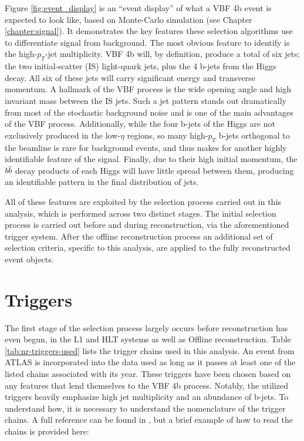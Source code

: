     Figure \ref{fig:event_display} is an ``event display'' of what a VBF \to 4b event is expected to look like,
        based on Monte-Carlo simulation (see Chapter \ref{chapter:signal}).
    It demonstrates the key features these selection algorithms use to differentiate signal from background.
    The most obvious feature to identify is the high-$p_T$-jet multiplicity.
    VBF \to 4b will, by definition, produce a total of six jets;
        the two initial-scatter (IS) light-quark jets, plus the 4 b-jets from the Higgs decay.
    All six of these jets will carry significant energy and transverse momentum.
    A hallmark of the VBF process is the wide opening angle and high invariant mass between the IS jets.
    Such a jet pattern stands out dramatically from most of the stochastic background noise
        and is one of the main advantages of the VBF process.
    Additionally, while the four b-jets of the Higgs are not exclusively produced in the low-$\eta$ regions,
        so many high-$p_T$ b-jets orthogonal to the beamline is rare for background events,
        and thus makes for another highly identifiable feature of the signal.
    Finally, due to their high initial momentum,
        the $b \bar{b}$ decay products of each Higgs will have little spread between them,
        producing an identifiable pattern in the final distribution of jets.

    All of these features are exploited by the selection process carried out in this analysis,
        which is performed across two distinct stages.
    The initial selection process is carried out before and during reconstruction, via the aforementioned trigger system.
    After the offline reconstruction process an additional set of selection criteria,
        specific to this analysis, are applied to the fully reconstructed event objects.
    
    \FloatBarrier
    \section{Triggers}
        
        The first stage of the selection process largely occurs before reconstruction has even begun,
            in the L1 and HLT systems as well as Offline reconstruction.
        Table \ref{tab:nr-triggers-used} lists the trigger chains used in this analysis.
        An event from ATLAS is incorporated into the data used as long as it passes at least one 
            of the listed chains associated with its year.
        These triggers have been chosen based on any features that lend themselves to the VBF \to 4b process.
        Notably, the utilized triggers heavily emphasize high jet multiplicity and an abundance of b-jets.
        To understand how, it is necessary to understand the nomenclature of the trigger chains.
        A full reference can be found in \cite{trigger_naming},
            but a brief example of how to read the chains is provided here:

